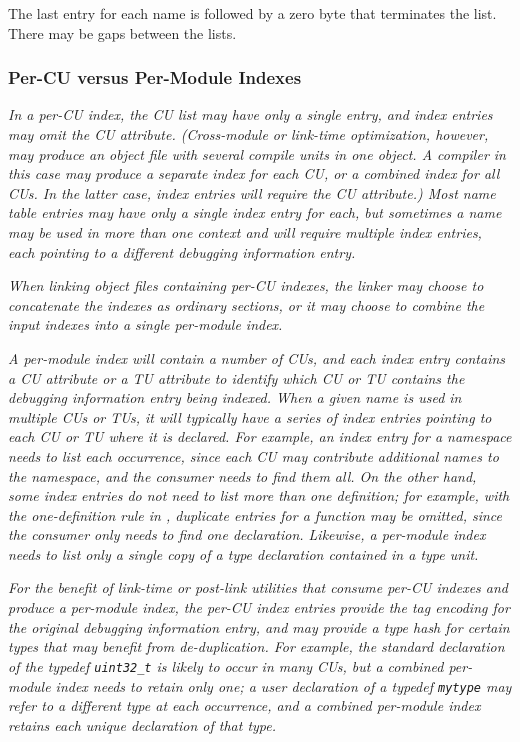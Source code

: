 The last entry for each name is followed by a zero byte that
terminates the list. There may be gaps between the lists.

\bb
\subsubsection{Per-CU versus Per-Module Indexes}
\eb
\label{chap:percuvspermoduleindexes}
\textit{In a per-CU index, the CU list may have only a single entry, 
and index entries may omit the CU attribute. (Cross-module or link-time
optimization, however, may produce an object file with several compile
units in one object. A compiler in this case may produce a separate
index for each CU, or a combined index for all CUs. In the latter
case, index entries will require the CU attribute.) Most name table
entries may have only a single index entry for each, but sometimes a
name may be used in more than one context and will require multiple
index entries, each pointing to a different debugging information
entry.}

\textit{When linking object files containing per-CU indexes, the 
linker may choose to concatenate the indexes as ordinary sections, 
or it may choose to combine the input indexes into a single 
per-module index.}

\textit{A per-module index will contain a number of CUs, and each index 
entry contains a CU attribute or a TU attribute to identify which 
CU or TU contains the debugging information entry being indexed. When a
given name is used in multiple CUs or TUs, it will typically have a
series of index entries pointing to each CU or TU where it is declared. 
For example, an index entry for a  namespace needs to
list each occurrence, since each CU may contribute additional names to
the namespace, and the consumer needs to find them all. On the
other hand, some index entries do not need to list more than one
definition; for example, with the one-definition rule in ,
duplicate entries for a function may be omitted, since the consumer
only needs to find one declaration. Likewise, a per-module index needs
to list only a single copy of a type declaration contained in a type
unit.}

\textit{For the benefit of link-time or post-link utilities that consume
per-CU indexes and produce a per-module index, the per-CU index
entries provide the tag encoding for the original debugging
information entry, and may provide a type hash for certain types that
may benefit from de-duplication. For example, the standard declaration
of the typedef \texttt{uint32\_t} is likely to occur in many CUs, but a
combined per-module index needs to retain only one; a user declaration
of a typedef \texttt{mytype} may refer to a different type at each
occurrence, and a combined per-module index retains each unique
declaration of that type.}


